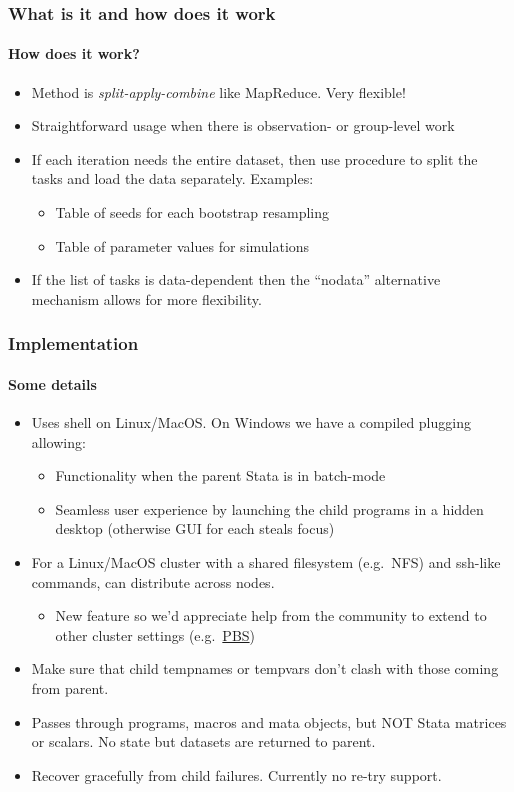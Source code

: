 \documentclass[9pt,\ExtraDocOpts]{beamer}
\begin{document}
\begin{frame} %
\frametitle{What is it and how does it work}
\framesubtitle{How does it work?}

\begin{itemize}
\item Method is \textit{split-apply-combine} like MapReduce. Very flexible!\pause{}
\item Straightforward usage when there is observation- or group-level work\pause{}
\item If each iteration needs the entire dataset, then use procedure to split the tasks and load the data separately. Examples:\pause{}
\begin{itemize}
\item Table of seeds for each bootstrap resampling\pause{}
\item Table of parameter values for simulations\pause{}
\end{itemize}
\item If the list of tasks is data-dependent then the ``nodata'' alternative mechanism allows for more flexibility.
\end{itemize}

\end{frame}


\begin{frame}
\frametitle{Implementation }
\framesubtitle{Some details}
\begin{itemize}
\item Uses shell on Linux/MacOS\@. On Windows we have a compiled plugging allowing:\pause{}
\begin{itemize}
\item Functionality when the parent Stata is in batch-mode\pause{}
\item Seamless user experience by launching the child programs in a hidden desktop (otherwise GUI for each steals focus)\pause{}
\end{itemize}
\item For a Linux/MacOS cluster with a shared filesystem (e.g.\ NFS) and ssh-like commands, can distribute across nodes. \pause{}
\begin{itemize}
\item New feature so we'd appreciate help from the community to extend to other cluster settings (e.g.\ \href{https://en.wikipedia.org/wiki/Portable_Batch_System}{PBS})\pause{}
\end{itemize}
\item Make sure that child tempnames or tempvars don't clash with those coming from parent.\pause{}
\item Passes through programs, macros and mata objects, but NOT Stata matrices or scalars. No state but datasets are returned to parent.\pause{}
\item Recover gracefully from child failures. Currently no re-try support.
\end{itemize}
\end{frame}
\end{document}
